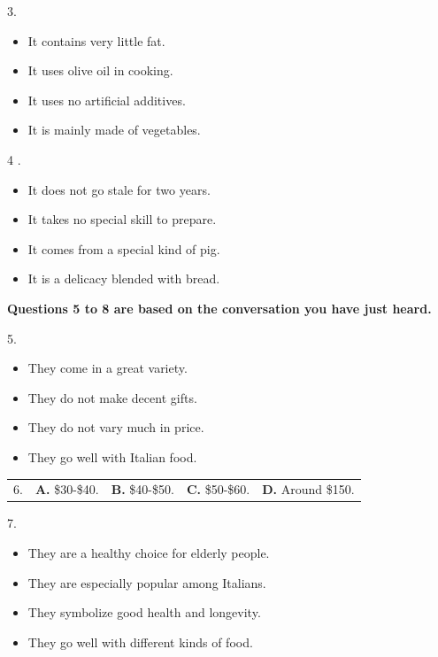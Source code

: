 \documentclass[UTF8,11pt]{ctexart}
\begin{document}
3.


\begin{itemize}[leftmargin=2em,itemsep=.2em,topsep=.4em]\item[A.] It contains very little fat.
\item[B.] It uses olive oil in cooking.
\item[C.] It uses no artificial additives.
\item[D.] It is mainly made of vegetables.
\end{itemize}

4 .


\begin{itemize}[leftmargin=2em,itemsep=.2em,topsep=.4em]\item[A.] It does not go stale for two years.
\item[B.] It takes no special skill to prepare.
\item[C.] It comes from a special kind of pig.
\item[D.] It is a delicacy blended with bread.
\end{itemize}

\textbf{Questions 5 to 8 are based on the conversation you have just heard.}


5.


\begin{itemize}[leftmargin=2em,itemsep=.2em,topsep=.4em]\item[A.] They come in a great variety.
\item[B.] They do not make decent gifts.
\item[C.] They do not vary much in price.
\item[D.] They go well with Italian food.
\end{itemize}

\noindent\begin{tabularx}{\linewidth}{@{}lXXXX@{}}6. & \textbf{A.} \$30-\$40. & \textbf{B.} \$40-\$50. & \textbf{C.} \$50-\$60. & \textbf{D.} Around \$150.\\\end{tabularx}\par

7.


\begin{itemize}[leftmargin=2em,itemsep=.2em,topsep=.4em]\item[A.] They are a healthy choice for elderly people.
\item[B.] They are especially popular among Italians.
\item[C.] They symbolize good health and longevity.
\item[D.] They go well with different kinds of food.
\end{itemize}
\end{document}
